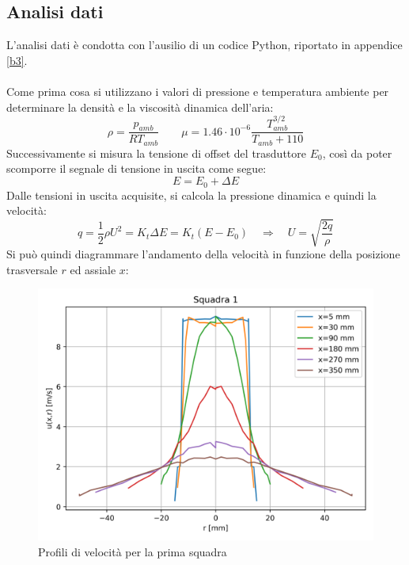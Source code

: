 \subsection{Analisi dati}
L'analisi dati è condotta con l'ausilio di un codice Python, riportato in appendice \ref{b3}.\\\\
Come prima cosa si utilizzano i valori di pressione e temperatura ambiente per determinare la densità e la viscosità dinamica dell'aria:
\begin{equation*}
    \rho = \frac{p_{amb}}{R T_{amb}} \qquad \mu = 1.46\cdot10^{-6} \frac{T_{amb}^{3/2}}{T_{amb}+110}
\end{equation*}
Successivamente si misura la tensione di offset del trasduttore $E_0$, così da poter scomporre il segnale di tensione in uscita come segue:
\begin{equation*}
    E = E_0 + \Delta E
\end{equation*}
Dalle tensioni in uscita acquisite, si calcola la pressione dinamica e quindi la velocità:
\begin{equation*}
    q = \frac12 \rho U^2 = K_t \Delta E = K_t (E - E_0) \quad \Rightarrow \quad U = \sqrt{\frac{2q}\rho}
\end{equation*}
Si può quindi diagrammare l'andamento della velocità in funzione della posizione trasversale $r$ ed assiale $x$:
\begin{figure}[h]
    \centering
    \includegraphics[width=.9\textwidth]{images/3/sq1.png}
    \caption{Profili di velocità per la prima squadra}
\end{figure}
